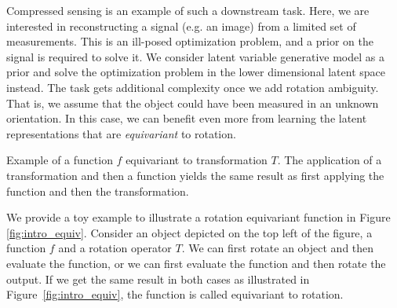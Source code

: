 Compressed sensing is an example of such a downstream task. Here, we are interested in reconstructing a signal (e.g. an image) from a limited set of measurements. 
This is an ill-posed optimization problem, and a prior on the signal is required to solve it. 
We consider latent variable generative model as a prior and solve the optimization problem in the lower dimensional latent space instead. 
The task gets additional complexity once we add rotation ambiguity. 
That is, we assume that the object could have been measured in an unknown orientation. 
In this case, we can benefit even more from learning the latent representations that are \textit{equivariant} to rotation. 
\begin{marginfigure}
\caption{Example of a function $f$ equivariant to transformation $T$. The application of a transformation and then a function yields the same result as first applying the function and then the transformation.}\label{fig:intro_equiv}
\end{marginfigure}

We provide a toy example to illustrate a rotation equivariant function in Figure \ref{fig:intro_equiv}. Consider an object depicted on the top left of the figure, a function $f$ and a rotation operator $T$.
We can first rotate an object and then evaluate the function, or we can first evaluate the function and then rotate the output. 
If we get the same result in both cases as illustrated in Figure~\ref{fig:intro_equiv}, the function is called equivariant to rotation. 

